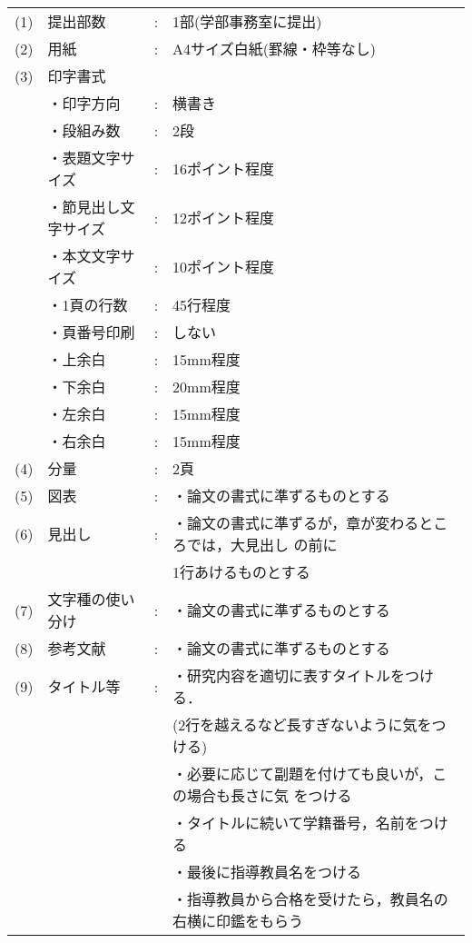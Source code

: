   \begin{tabular}{llcl}
    (1)&提出部数&:&1部(学部事務室に提出)\\
    (2)&用紙    &:&A4サイズ白紙(罫線・枠等なし)\\
    (3)&印字書式& & \\
       &\hspace*{1zw}・印字方向&:&横書き\\
       &\hspace*{1zw}・段組み数&:&2段\\
       &\hspace*{1zw}・表題文字サイズ&:&16ポイント程度\\
       &\hspace*{1zw}・節見出し文字サイズ&:&12ポイント程度\\
       &\hspace*{1zw}・本文文字サイズ&:&10ポイント程度\\
       &\hspace*{1zw}・1頁の行数&:&45行程度\\
       &\hspace*{1zw}・頁番号印刷&:&しない\\
       &\hspace*{1zw}・上余白&:&15mm程度\\
       &\hspace*{1zw}・下余白&:&20mm程度\\
       &\hspace*{1zw}・左余白&:&15mm程度\\
       &\hspace*{1zw}・右余白&:&15mm程度\\
    (4)&分量&:&2頁\\
    (5)&図表&:&・論文の書式に準ずるものとする\\
    (6)&見出し&:&・論文の書式に準ずるが，章が変わるところでは，大見出し
        の前に\\
          & & &\hspace*{1zw}1行あけるものとする\\
    (7)&文字種の使い分け&:&・論文の書式に準ずるものとする\\
    (8)&参考文献&:&・論文の書式に準ずるものとする\\
    (9)&タイトル等&:&・研究内容を適切に表すタイトルをつける．\\
          & & &\hspace*{1zw}(2行を越えるなど長すぎないように気をつける)\\
          & & &・必要に応じて副題を付けても良いが，この場合も長さに気
          をつける\\
          & & &・タイトルに続いて学籍番号，名前をつける\\
          & & &・最後に指導教員名をつける\\
          & & &・指導教員から合格を受けたら，教員名の右横に印鑑をもらう\\
  \end{tabular}

\clearpage

